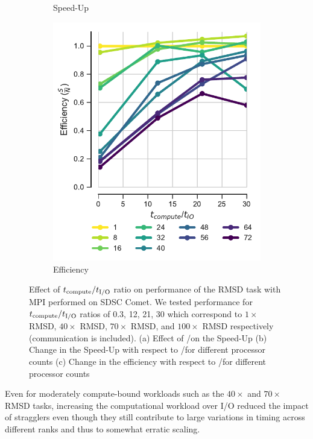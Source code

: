 \begin{figure}[ht!]
\begin{subfigure}{.3\textwidth}
  \caption{Speed-Up}
  \label{fig:S2_tcomp_tIO_effect}
\end{subfigure}
\hfill
\begin{subfigure}{.3\textwidth}
  \includegraphics[width=\linewidth]{figures/Compute_to_IO_ratio_on_performance_2d_3_v17.pdf}
  \caption{Efficiency}
  \label{fig:E_tcomp_tIO_effect}
\end{subfigure}
%
\caption{Effect of ${t}_{\text{compute}}/{t}_{\text{I/O}}$ ratio on performance of the RMSD task with MPI performed on SDSC Comet. We tested performance for ${t}_{\text{compute}}/{t}_{\text{I/O}}$ ratios of 0.3, 12, 21, 30
which correspond to $1\times$ RMSD, $40\times$ RMSD, $70\times$ RMSD, and $100\times$ RMSD respectively (communication is included). (a) Effect of \tcomp/\tIO on the Speed-Up
(b) Change in the Speed-Up with respect to \tcomp/\tIO for different processor counts (c) Change in the efficiency with respect to \tcomp/\tIO for different processor counts}
\label{fig:tcomp_tIO_effect}
\end{figure}

Even for moderately compute-bound workloads such
as the $40\times$ and $70\times$ RMSD tasks, increasing the computational workload over I/O reduced the impact of stragglers even
though they still contribute to large variations in timing across different ranks and thus to somewhat erratic scaling.

